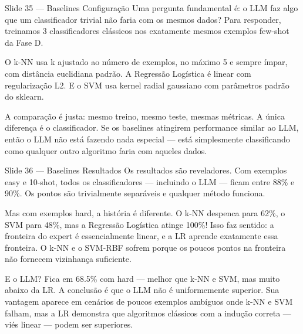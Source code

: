 \documentclass[aspectratio=169,11pt]{beamer}
\begin{document}
\begin{frame}{Slide 35 --- Baselines Configuração}
\small
Uma pergunta fundamental é: o LLM faz algo que um classificador trivial não faria com os mesmos dados? Para responder, treinamos 3 classificadores clássicos nos exatamente mesmos exemplos few-shot da Fase D.

O k-NN usa k ajustado ao número de exemplos, no máximo 5 e sempre ímpar, com distância euclidiana padrão. A Regressão Logística é linear com regularização L2. E o SVM usa kernel radial gaussiano com parâmetros padrão do sklearn.

A comparação é justa: mesmo treino, mesmo teste, mesmas métricas. A única diferença é o classificador. Se os baselines atingirem performance similar ao LLM, então o LLM não está fazendo nada especial --- está simplesmente classificando como qualquer outro algoritmo faria com aqueles dados.
\end{frame}

\begin{frame}{Slide 36 --- Baselines Resultados}
\small
Os resultados são reveladores. Com exemplos easy e 10-shot, todos os classificadores --- incluindo o LLM --- ficam entre 88\% e 90\%. Os pontos são trivialmente separáveis e qualquer método funciona.

Mas com exemplos hard, a história é diferente. O k-NN despenca para 62\%, o SVM para 48\%, mas a Regressão Logística atinge 100\%! Isso faz sentido: a fronteira do expert é essencialmente linear, e a LR aprende exatamente essa fronteira. O k-NN e o SVM-RBF sofrem porque os poucos pontos na fronteira não fornecem vizinhança suficiente.

E o LLM? Fica em 68.5\% com hard --- melhor que k-NN e SVM, mas muito abaixo da LR. A conclusão é que o LLM não é uniformemente superior. Sua vantagem aparece em cenários de poucos exemplos ambíguos onde k-NN e SVM falham, mas a LR demonstra que algoritmos clássicos com a indução correta --- viés linear --- podem ser superiores.
\end{frame}
\end{document}
